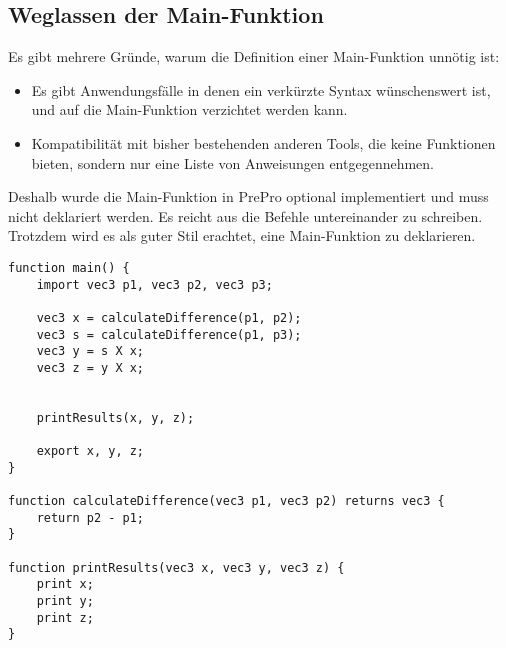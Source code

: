 \subsection{Weglassen der Main-Funktion}
Es gibt mehrere Gründe, warum die Definition einer Main-Funktion unnötig ist:
\begin{itemize}
\item Es gibt Anwendungsfälle in denen ein verkürzte Syntax wünschenswert ist, und auf die Main-Funktion verzichtet werden kann.
\item Kompatibilität mit bisher bestehenden anderen Tools, die keine Funktionen bieten, sondern nur eine Liste von Anweisungen entgegennehmen.
\end{itemize}
Deshalb wurde die Main-Funktion in \acs{PrePro} optional implementiert und muss nicht deklariert werden.
Es reicht aus die Befehle untereinander zu schreiben.\\
Trotzdem wird es als guter Stil erachtet, eine Main-Funktion zu deklarieren.

\begin{lstlisting}[language=prepro, label={lst:Bsp_Funktionen}, caption={Beispiel Funktionen}, captionpos=b]
function main() {
	import vec3 p1, vec3 p2, vec3 p3;

	vec3 x = calculateDifference(p1, p2);
	vec3 s = calculateDifference(p1, p3);
	vec3 y = s X x;
	vec3 z = y X x;


	printResults(x, y, z);

	export x, y, z;
}

function calculateDifference(vec3 p1, vec3 p2) returns vec3 {
	return p2 - p1;
}

function printResults(vec3 x, vec3 y, vec3 z) {
	print x;
	print y;
	print z;
}
\end{lstlisting}

